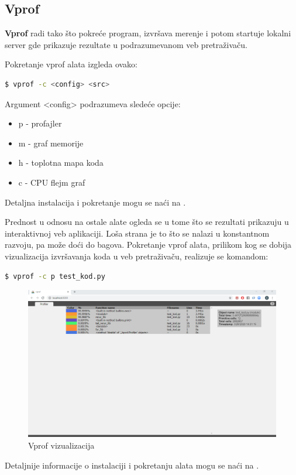 \documentclass[a4paper]{article}
\begin{document}
\subsection{Vprof}
\label{profajler_6}
	
\textbf{Vprof} radi tako što pokreće program, izvršava merenje i potom startuje lokalni server gde prikazuje rezultate u podrazumevanom veb pretraživaču.

Pokretanje vprof alata izgleda ovako:
\begin{lstlisting}[language=bash, belowskip=-\baselineskip]
  $ vprof -c <config> <src>
\end{lstlisting}
Argument <config> podrazumeva sledeće opcije:
\begin{itemize}
    \item  p - profajler
    \item  m - graf memorije
    \item  h - toplotna mapa koda
    \item  c - CPU flejm graf
\end{itemize}
Detaljna instalacija i pokretanje mogu se naći na \cite{vprof}.

Prednost u odnosu na ostale alate ogleda se u tome što se rezultati prikazuju u interaktivnoj veb aplikaciji. Loša strana je to što se nalazi u konstantnom razvoju, pa može doći do bagova. Pokretanje vprof alata, prilikom kog se dobija vizualizacija izvršavanja koda u veb pretraživaču, realizuje se komandom:
\begin{lstlisting}[language=bash, belowskip=-\baselineskip]
  $ vprof -c p test_kod.py
\end{lstlisting}
\begin{figure}[h!]
\begin{center}
\includegraphics[trim={0cm 20cm 0cm 0cm},clip,scale=0.23]{vprof.png}
\end{center}
\caption{Vprof vizualizacija}
\label{fig:vprof_1}
\end{figure}Detaljnije informacije o instalaciji i pokretanju alata mogu se naći na \cite{vprof}.
\end{document}
